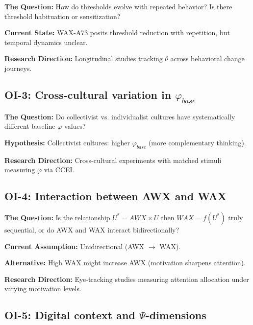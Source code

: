 \textbf{The Question:} How do thresholds evolve with repeated behavior? Is there threshold habituation or sensitization?

\textbf{Current State:} WAX-A73 posits threshold reduction with repetition, but temporal dynamics unclear.

\textbf{Research Direction:} Longitudinal studies tracking $\theta$ across behavioral change journeys.

\subsection{OI-3: Cross-cultural variation in $\varphi_{base}$}

\textbf{The Question:} Do collectivist vs. individualist cultures have systematically different baseline $\varphi$ values?

\textbf{Hypothesis:} Collectivist cultures: higher $\varphi_{base}$ (more complementary thinking).

\textbf{Research Direction:} Cross-cultural experiments with matched stimuli measuring $\varphi$ via CCEI.

\subsection{OI-4: Interaction between AWX and WAX}

\textbf{The Question:} Is the relationship $U^* = AWX \times U$ then $WAX = f(U^*)$ truly sequential, or do AWX and WAX interact bidirectionally?

\textbf{Current Assumption:} Unidirectional (AWX $\to$ WAX).

\textbf{Alternative:} High WAX might increase AWX (motivation sharpens attention).

\textbf{Research Direction:} Eye-tracking studies measuring attention allocation under varying motivation levels.

\subsection{OI-5: Digital context and $\Psi$-dimensions}

